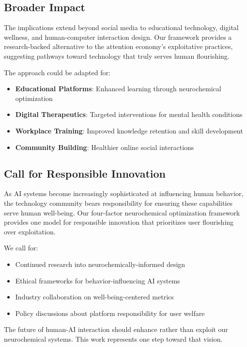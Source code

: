\documentclass[11pt,letterpaper]{article}
\begin{document}
\subsection{Broader Impact}

The implications extend beyond social media to educational technology, digital wellness, and human-computer interaction design. Our framework provides a research-backed alternative to the attention economy's exploitative practices, suggesting pathways toward technology that truly serves human flourishing.

The approach could be adapted for:
\begin{itemize}
    \item \textbf{Educational Platforms}: Enhanced learning through neurochemical optimization
    \item \textbf{Digital Therapeutics}: Targeted interventions for mental health conditions
    \item \textbf{Workplace Training}: Improved knowledge retention and skill development
    \item \textbf{Community Building}: Healthier online social interactions
\end{itemize}

\subsection{Call for Responsible Innovation}

As AI systems become increasingly sophisticated at influencing human behavior, the technology community bears responsibility for ensuring these capabilities serve human well-being. Our four-factor neurochemical optimization framework provides one model for responsible innovation that prioritizes user flourishing over exploitation.

We call for:
\begin{itemize}
    \item Continued research into neurochemically-informed design
    \item Ethical frameworks for behavior-influencing AI systems
    \item Industry collaboration on well-being-centered metrics
    \item Policy discussions about platform responsibility for user welfare
\end{itemize}

The future of human-AI interaction should enhance rather than exploit our neurochemical systems. This work represents one step toward that vision.
\end{document}
